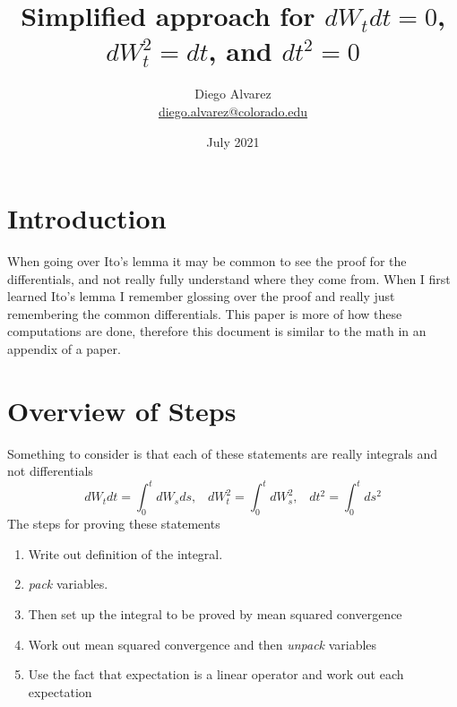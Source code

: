 \documentclass{article}
\title{Simplified approach for $dW_tdt=0$, $dW_t^2=dt$, and $dt^2=0$}
\author{Diego Alvarez \\ \href{mailto:diego.alvarez@colorado.edu}{diego.alvarez@colorado.edu}}
\date{July 2021}
\begin{document}
\maketitle

\section*{Introduction}
When going over Ito's lemma it may be common to see the proof for the differentials, and not really fully understand where they come from. When I first learned Ito's lemma I remember glossing over the proof and really just remembering the common differentials.
\newline
\newline
This paper is more of how these computations are done, therefore this document is similar to the math in an appendix of a paper. 

\section*{Overview of Steps}
Something to consider is that each of these statements are really integrals and not differentials 
$$
dW_tdt = \int_0^t dW_s ds, \; \; \; dW_t^2 = \int_0^t dW_s^2, \; \; \; dt^2 = \int_0^t ds^2   
$$
The steps for proving these statements
\begin{enumerate}
  \item Write out definition of the integral.
  \item \emph{pack} variables.
  \item Then set up the integral to be proved by mean squared convergence
  \item Work out mean squared convergence and then \emph{unpack} variables
  \item Use the fact that expectation is a linear operator and work out each expectation
\end{enumerate}
\end{document}
